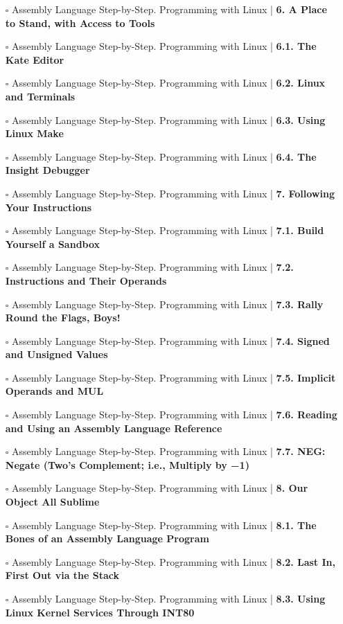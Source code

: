 \documentclass[a4, landscape, 12pt]{article}
\newcommand{\checkbox}{$\square$}%
\begin{document}
\begin{itemize}
{}
\item [\checkbox]  Assembly Language Step-by-Step. Programming with Linux | \textbf{ 6. A Place to Stand, with Access to Tools
}
\item [\checkbox]  Assembly Language Step-by-Step. Programming with Linux | \textbf{ 6.1. The Kate Editor
}
\item [\checkbox]  Assembly Language Step-by-Step. Programming with Linux | \textbf{ 6.2. Linux and Terminals
}
\item [\checkbox]  Assembly Language Step-by-Step. Programming with Linux | \textbf{ 6.3. Using Linux Make
}
\item [\checkbox]  Assembly Language Step-by-Step. Programming with Linux | \textbf{ 6.4. The Insight Debugger
}
\item [\checkbox]  Assembly Language Step-by-Step. Programming with Linux | \textbf{ 7. Following Your Instructions
}
\item [\checkbox]  Assembly Language Step-by-Step. Programming with Linux | \textbf{ 7.1. Build Yourself a Sandbox
}
\item [\checkbox]  Assembly Language Step-by-Step. Programming with Linux | \textbf{ 7.2. Instructions and Their Operands
}
\item [\checkbox]  Assembly Language Step-by-Step. Programming with Linux | \textbf{ 7.3. Rally Round the Flags, Boys!
}
\item [\checkbox]  Assembly Language Step-by-Step. Programming with Linux | \textbf{ 7.4. Signed and Unsigned Values
}
\item [\checkbox]  Assembly Language Step-by-Step. Programming with Linux | \textbf{ 7.5. Implicit Operands and MUL
}
\item [\checkbox]  Assembly Language Step-by-Step. Programming with Linux | \textbf{ 7.6. Reading and Using an Assembly Language Reference
}
\item [\checkbox]  Assembly Language Step-by-Step. Programming with Linux | \textbf{ 7.7. NEG: Negate (Two's Complement; i.e., Multiply by −1)
}
\item [\checkbox]  Assembly Language Step-by-Step. Programming with Linux | \textbf{ 8. Our Object All Sublime
}
\item [\checkbox]  Assembly Language Step-by-Step. Programming with Linux | \textbf{ 8.1. The Bones of an Assembly Language Program
}
\item [\checkbox]  Assembly Language Step-by-Step. Programming with Linux | \textbf{ 8.2. Last In, First Out via the Stack
}
\item [\checkbox]  Assembly Language Step-by-Step. Programming with Linux | \textbf{ 8.3. Using Linux Kernel Services Through INT80
}
\end{itemize}
\end{document}

